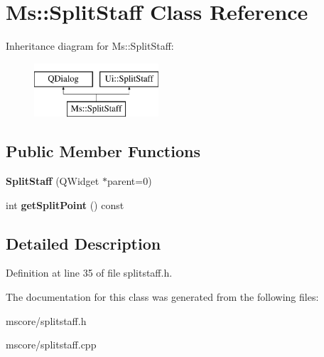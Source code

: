 \hypertarget{class_ms_1_1_split_staff}{}\section{Ms\+:\+:Split\+Staff Class Reference}
\label{class_ms_1_1_split_staff}
Inheritance diagram for Ms\+:\+:Split\+Staff\+:\begin{figure}[H]
\begin{center}
\leavevmode
\includegraphics[height=2.000000cm]{class_ms_1_1_split_staff}
\end{center}
\end{figure}
\subsection*{Public Member Functions}
\begin{DoxyCompactItemize}
\item 
\mbox{\label{class_ms_1_1_split_staff_a70aaed42d63fde858e4158895a8bda65}} 
{\bfseries Split\+Staff} (Q\+Widget $\ast$parent=0)
\item 
\mbox{\label{class_ms_1_1_split_staff_a3cade784c5a99eab62449920c4362dd7}} 
int {\bfseries get\+Split\+Point} () const
\end{DoxyCompactItemize}


\subsection{Detailed Description}


Definition at line 35 of file splitstaff.\+h.



The documentation for this class was generated from the following files\+:\begin{DoxyCompactItemize}
\item 
mscore/splitstaff.\+h\item 
mscore/splitstaff.\+cpp\end{DoxyCompactItemize}
